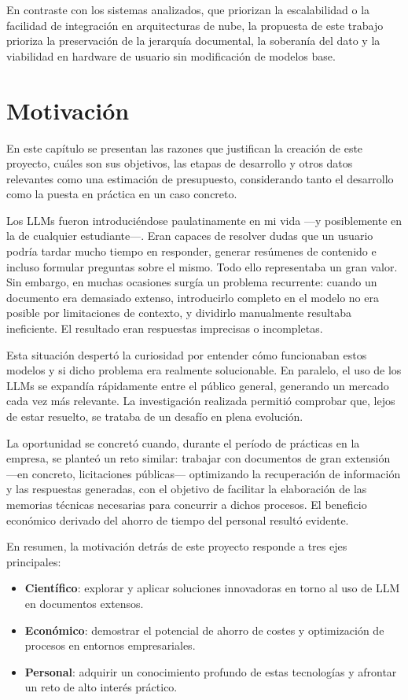 En contraste con los sistemas analizados, que priorizan la escalabilidad o la facilidad de integración en arquitecturas de nube, la propuesta de este trabajo prioriza la preservación de la jerarquía documental, la soberanía del dato y la viabilidad en hardware de usuario sin modificación de modelos base.

\chapter{Motivación}\label{cap3}

En este capítulo se presentan las razones que justifican la creación de este proyecto, cuáles son sus objetivos, las etapas de desarrollo y otros datos relevantes como una estimación de presupuesto, considerando tanto el desarrollo como la puesta en práctica en un caso concreto.

Los LLMs fueron introduciéndose paulatinamente en mi vida —y posiblemente en la de cualquier estudiante—. Eran capaces de resolver dudas que un usuario podría tardar mucho tiempo en responder, generar resúmenes de contenido e incluso formular preguntas sobre el mismo. Todo ello representaba un gran valor. Sin embargo, en muchas ocasiones surgía un problema recurrente: cuando un documento era demasiado extenso, introducirlo completo en el modelo no era posible por limitaciones de contexto, y dividirlo manualmente resultaba ineficiente. El resultado eran respuestas imprecisas o incompletas.

Esta situación despertó la curiosidad por entender cómo funcionaban estos modelos y si dicho problema era realmente solucionable. En paralelo, el uso de los LLMs se expandía rápidamente entre el público general, generando un mercado cada vez más relevante. La investigación realizada permitió comprobar que, lejos de estar resuelto, se trataba de un desafío en plena evolución.

La oportunidad se concretó cuando, durante el período de prácticas en la empresa, se planteó un reto similar: trabajar con documentos de gran extensión —en concreto, licitaciones públicas— optimizando la recuperación de información y las respuestas generadas, con el objetivo de facilitar la elaboración de las memorias técnicas necesarias para concurrir a dichos procesos. El beneficio económico derivado del ahorro de tiempo del personal resultó evidente.  

En resumen, la motivación detrás de este proyecto responde a tres ejes principales:  
\begin{itemize}
    \item \textbf{Científico}: explorar y aplicar soluciones innovadoras en torno al uso de LLM en documentos extensos.  
    \item \textbf{Económico}: demostrar el potencial de ahorro de costes y optimización de procesos en entornos empresariales.  
    \item \textbf{Personal}: adquirir un conocimiento profundo de estas tecnologías y afrontar un reto de alto interés práctico.  
\end{itemize}

